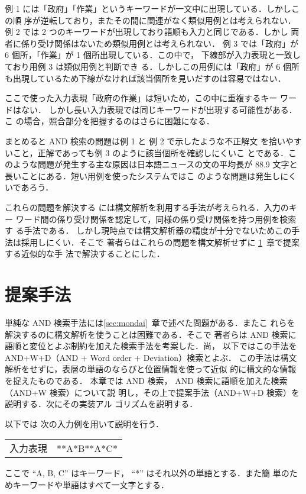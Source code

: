 \smallskip

例 1 には「政府」「作業」というキーワードが一文中に出現している．しかしこの順
序が逆転しており，またその間に関連がなく類似用例とは考えられない．
例 2 では 2 つのキーワードが出現しており語順も入力と同じである．しかし
両者に係り受け関係はないため類似用例とは考えられない．
例 3 では「政府」が 6 個所，「作業」が 1 個所出現している．この中で，
下線部が入力表現と一致しており用例 3 は類似用例と判断でき
る．しかしこの用例には「政府」が 6 個所
も出現しているため下線がなければ該当個所を見いだすのは容易ではない．

ここで使った入力表現「政府の作業」は短いため，この中に重複するキー
ワードはない．
しかし長い入力表現では同じキーワードが出現する可能性がある．こ
の場合，照合部分を把握するのはさらに困難になる．

まとめると AND 検索の問題は例 1 と 例 2 で示したような不正解文
を拾いやすいこと，正解であっても例 3 のように該当個所を確認しにくいこ
とである．このような問題が発生する主な原因は日本語ニュースの文の平均長が 
88.9 文字\cite{Kuma96}と長いことにある．短い用例を使ったシステムではこ
のような問題は発生しにくいであろう．

これらの問題を解決する
には構文解析を利用する手法が考えられる．入力のキー
ワード間の係り受け関係を認定して，同様の係り受け関係を持つ用例を検索す
る手法である\cite{Hyou94}．
しかし現時点では構文解析器の精度が十分でないためこの手法は採用しにくい．そこで
著者らはこれらの問題を構文解析せずに \ref{sec:algo}~章で提案する近似的な手
法で解決することにした．
\section{提案手法}
\label{sec:algo}
単純な AND 検索手法には\ref{sec:mondai}~章で述べた問題がある．またこ
れらを解決するのに構文解析を使うことは困難である．そこで
著者らは AND 検索に語順と変位とよぶ制約を加えた検索手法を考案した．尚，
以下ではこの手法を AND+W+D（AND + Word order + Deviation）検索とよぶ．
この手法は構文解析をせずに，表層の単語のならびと位置情報を使って近似
的に構文的な情報を捉えたものである．
本章では AND 検索， AND 検索に語順を加えた検索（AND+W 検索）について説
明し，その上で提案手法（AND+W+D 検索）を説明する．次にその実装アル
ゴリズムを説明する．

以下では
次の入力例を用いて説明を行う．
\begin{center}
\begin{tabular}{ll}
入力表現 & **A*B**A*C*
\end{tabular}
\end{center}
ここで ``A, B, C'' はキーワード， ``*'' はそれ以外の単語とする．また簡
単のためキーワードや単語はすべて一文字とする．
